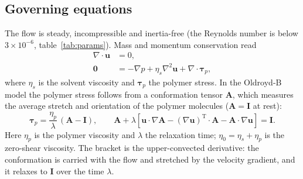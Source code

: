 \documentclass[11pt,a4paper]{article}
\begin{document}
\subsection{Governing equations}
The flow is steady, incompressible and inertia-free (the Reynolds number is below $3\times10^{-6}$, table~\ref{tab:params}). Mass and momentum conservation read
\begin{align}
\nabla\cdot\mathbf{u}&=0, \label{eq:mass}\\
\mathbf{0}&=-\nabla p+\eta_s\nabla^2\mathbf{u}+\nabla\cdot\boldsymbol{\tau}_p, \label{eq:mom}
\end{align}
where $\eta_s$ is the solvent viscosity and $\boldsymbol\tau_p$ the polymer stress. In the Oldroyd-B model \cite{oldroyd1950,bird1987} the polymer stress follows from a conformation tensor $\mathbf{A}$, which measures the average stretch and orientation of the polymer molecules ($\mathbf{A}=\mathbf{I}$ at rest):
\begin{equation}
\boldsymbol\tau_p=\frac{\eta_p}{\lambda}\,(\mathbf{A}-\mathbf{I}),\qquad
\mathbf{A}+\lambda\left[\mathbf{u}\cdot\nabla\mathbf{A}-(\nabla\mathbf{u})^{\mathrm T}\cdot\mathbf{A}-\mathbf{A}\cdot\nabla\mathbf{u}\right]=\mathbf{I}.
\label{eq:oldroyd}
\end{equation}
Here $\eta_p$ is the polymer viscosity and $\lambda$ the relaxation time; $\eta_0=\eta_s+\eta_p$ is the zero-shear viscosity. The bracket is the upper-convected derivative: the conformation is carried with the flow and stretched by the velocity gradient, and it relaxes to $\mathbf I$ over the time $\lambda$.
\end{document}
